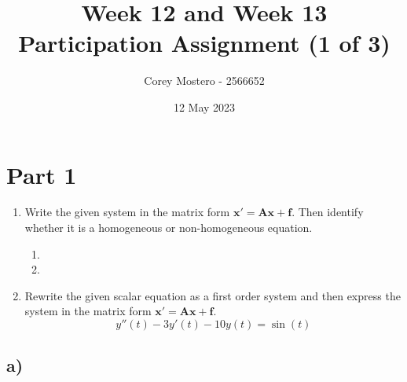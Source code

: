\documentclass{article}
\title{Week 12 and Week 13 Participation Assignment (1 of 3)}
\date{12 May 2023}
\author{Corey Mostero - 2566652}
\begin{document}
\newcommand{\hr}{\par\noindent\rule{\textwidth}{0.4pt}}

\newcommand{\bc}[1]{
	\begin{equation*}
		\begin{boxed}
			{#1}
		\end{boxed}
	\end{equation*}
}

\newcommand{\cond}[2]{
	\ifmmode
		{#1} \quad {#2}
	\else
		$$ {#1} \quad {#2} $$
	\fi
}

\newcommand{\vect}[1]{ \textbf{#1} }
\newcommand{\matr}[1]{ \textbf{\textit{#1}} }

\maketitle
\newpage

\tableofcontents

\section{Part 1}

\begin{enumerate}[label = \textbf{\alph*)}]
	\item
		Write the given system in the matrix form $ \mathbf{x' = Ax + f} $. Then identify whether it is a homogeneous or non-homogeneous equation.
		\begin{enumerate}[label = \textbf{\arabic*)}]
			\item
			\item
		\end{enumerate}
	\item
		Rewrite the given scalar equation as a first order system and then express the system in the matrix form $ \mathbf{x' = Ax + f} $.
		$$ y''(t) - 3y'(t) - 10y(t) = \sin(t) $$
\end{enumerate}

\subsection{a)}
\end{document}
